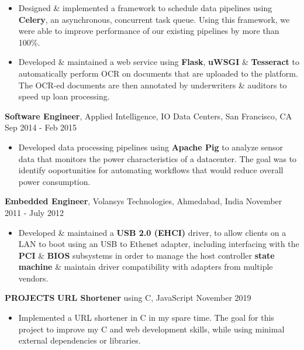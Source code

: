 \documentclass[10pt, letterpaper]{article}
\begin{document}
\begin{itemize}
\item Designed \& implemented a framework to schedule data pipelines using \textbf{Celery}, an asynchronous, concurrent task queue. Using this framework, we were able to improve performance of our existing pipelines by more than 100\%.
\item Developed \& maintained a web service using \textbf{Flask}, \textbf{uWSGI} \& \textbf{Tesseract} to automatically perform OCR on documents that are uploaded to the platform. The OCR-ed documents are then annotated by underwriters \& auditors to speed up loan processing.
\end{itemize}
\textbf{Software Engineer}, Applied Intelligence, IO Data Centers, San Francisco, CA \hfill Sep 2014 - Feb 2015
\begin{itemize}
\item Developed data processing pipelines using \textbf{Apache Pig} to analyze sensor data that monitors the power characteristics of a datacenter. The goal was to identify ooportunities for automating workflows that would reduce overall power consumption.
\end{itemize}
\textbf{Embedded Engineer}, Volansys Technologies, Ahmedabad, India \hfill November 2011 - July 2012
\begin{itemize}
\item Developed \& maintained a \textbf{USB 2.0 (EHCI)} driver, to allow clients on a LAN to boot using an USB to Ethenet adapter, including interfacing with the \textbf{PCI} \& \textbf{BIOS} subsystems in order to manage the host controller \textbf{state machine} \& maintain driver compatibility with adapters from multiple vendors. 
\end{itemize}

\textbf{PROJECTS}
\smallskip 
\newline
\textbf{URL Shortener} using C, JavaScript \hfill November 2019
\begin{itemize}
\item Implemented a URL shortener in C in my spare time. The goal for this project to improve my C and web development skills, while using minimal external dependencies or libraries.
\end{itemize}
\end{document}
